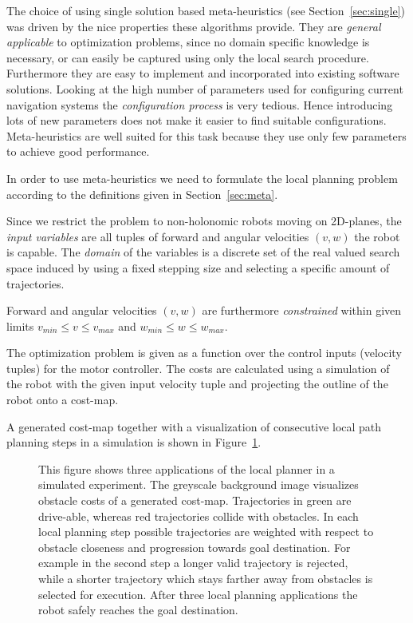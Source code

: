 The choice of using single solution based meta-heuristics (see Section~\ref{sec:single}) was driven by the nice properties these algorithms provide. 
They are \emph{general applicable} to optimization problems, since no domain specific knowledge is necessary, or can easily be captured using only the local search procedure.
Furthermore they are easy to implement and incorporated into existing software solutions.
Looking at the high number of parameters used for configuring current navigation systems the \emph{configuration process} is very tedious. 
Hence introducing lots of new parameters does not make it easier to find suitable configurations.
Meta-heuristics are well suited for this task because they use only few parameters to achieve good performance.  

In order to use meta-heuristics we need to formulate the local planning problem according to the definitions given in Section~\ref{sec:meta}.

Since we restrict the problem to non-holonomic robots moving on 2D-planes, the \emph{input variables} are all tuples of forward and angular velocities $(v,w)$ the robot is capable.
The \emph{domain} of the variables is a discrete set of the real valued search space induced by using a fixed stepping size and selecting a specific amount of trajectories.
 
Forward and angular velocities $(v,w)$ are furthermore \emph{constrained} within given limits $v_{min} \leq v \leq v_{max}$ and $w_{min} \leq w \leq w_{max}$.

The optimization problem is given as a function over the control inputs (velocity tuples) for the motor controller. 
The costs are calculated using a simulation of the robot with the given input velocity tuple and projecting the outline of the robot onto a cost-map. 

A generated cost-map together with a visualization of consecutive local path planning steps in a simulation is shown in Figure~\ref{fig:fig_instances_detail}.
   
\begin{figure}[thpb]
     \footnotesize
      \centering
      \setlength\fboxsep{0pt}
      \setlength\fboxrule{0.5pt}
       \def\svgwidth{\textwidth}
       
		\caption[Local-path planning simulation.]{This figure shows three applications of the local planner in a simulated experiment. The greyscale background image visualizes obstacle costs of a generated cost-map. Trajectories in green are drive-able, whereas red trajectories collide with obstacles. In each local planning step possible trajectories are weighted with respect to obstacle closeness and progression towards goal destination. For example in the second step a longer valid trajectory is rejected, while a shorter trajectory which stays farther away from obstacles is selected for execution. After three local planning applications the robot safely reaches the goal destination.}
		\label{fig:fig_instances_detail}
\end{figure}

